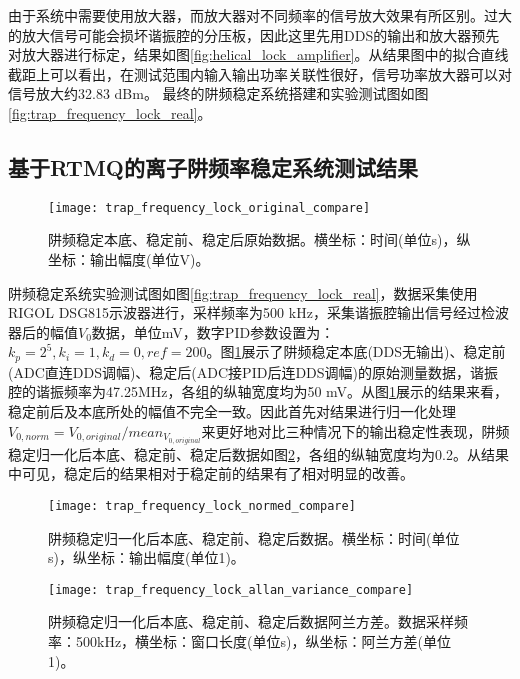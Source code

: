 由于系统中需要使用放大器，而放大器对不同频率的信号放大效果有所区别。过大的放大信号可能会损坏谐振腔的分压板，因此这里先用DDS的输出和放大器预先对放大器进行标定，结果如图\ref{fig:helical_lock_amplifier}。从结果图中的拟合直线截距上可以看出，在测试范围内输入输出功率关联性很好，信号功率放大器可以对信号放大约32.83 dBm。
最终的阱频稳定系统搭建和实验测试图如图\ref{fig:trap_frequency_lock_real}。


\subsection[基于RTMQ的离子阱频率稳定系统测试结果]{基于RTMQ的离子阱频率稳定系统测试结果}

\begin{figure}
    \centering
    \texttt{[image: trap\_frequency\_lock\_original\_compare]}
    \caption[阱频稳定本底、稳定前、稳定后原始数据]{阱频稳定本底、稳定前、稳定后原始数据。横坐标：时间(单位s)，纵坐标：输出幅度(单位V)。\label{fig:trap_frequency_lock_original_compare}}
\end{figure}



阱频稳定系统实验测试图如图\ref{fig:trap_frequency_lock_real}，数据采集使用RIGOL DSG815示波器进行，采样频率为500 kHz，采集谐振腔输出信号经过检波器后的幅值$V_0$数据，单位mV，数字PID参数设置为：$k_p=2^5,k_i=1,k_d=0, ref=200$。图\ref{fig:trap_frequency_lock_original_compare}展示了阱频稳定本底(DDS无输出)、稳定前(ADC直连DDS调幅)、稳定后(ADC接PID后连DDS调幅)的原始测量数据，谐振腔的谐振频率为47.25MHz，各组的纵轴宽度均为50 mV。从图\ref{fig:trap_frequency_lock_original_compare}展示的结果来看，稳定前后及本底所处的幅值不完全一致。因此首先对结果进行归一化处理$V_{0,norm}=V_{0,original}/mean_{V_{0,original}}$来更好地对比三种情况下的输出稳定性表现，阱频稳定归一化后本底、稳定前、稳定后数据如图\ref{fig:trap_frequency_lock_normed_compare}，各组的纵轴宽度均为0.2。从结果中可见，稳定后的结果相对于稳定前的结果有了相对明显的改善。

\begin{figure}
    \centering
    \texttt{[image: trap\_frequency\_lock\_normed\_compare]}
    \caption[阱频稳定归一化后本底、稳定前、稳定后数据]{阱频稳定归一化后本底、稳定前、稳定后数据。横坐标：时间(单位s)，纵坐标：输出幅度(单位1)。\label{fig:trap_frequency_lock_normed_compare}}
\end{figure}

\begin{figure}
    \centering
    \texttt{[image: trap\_frequency\_lock\_allan\_variance\_compare]}
    \caption[阱频稳定归一化后本底、稳定前、稳定后数据阿兰方差。]{阱频稳定归一化后本底、稳定前、稳定后数据阿兰方差。数据采样频率：500kHz，横坐标：窗口长度(单位s)，纵坐标：阿兰方差(单位1)。\label{fig:trap_frequency_lock_allan_variance_compare}}
\end{figure}


